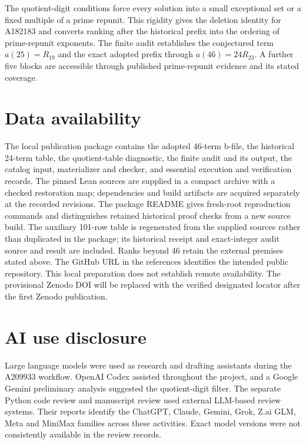 \documentclass[11pt]{article}
\begin{document}
The quotient-digit conditions force every solution into a small
exceptional set or a fixed multiple of a prime repunit. This rigidity
gives the deletion identity for A182183 and converts ranking after
the historical prefix into the ordering of prime-repunit exponents.
The finite audit establishes the conjectured term \(a(25)=R_{19}\)
and the exact adopted prefix through \(a(46)=24R_{23}\). A further
five blocks are accessible through published prime-repunit evidence
and its stated coverage.

\section*{Data availability}

The local publication package contains the adopted 46-term b-file,
the historical 24-term table, the quotient-table diagnostic, the finite
audit and its output, the catalog input, materializer and checker,
and essential execution and verification records. The pinned Lean
sources are supplied in a compact archive with a checked restoration
map; dependencies and build artifacts are acquired separately at the
recorded revisions. The package README gives fresh-root reproduction
commands and distinguishes retained historical proof checks from a
new source build. The auxiliary 101-row table is regenerated from
the supplied sources rather than duplicated in the package; its
historical receipt and exact-integer audit source and result are included.
Ranks beyond 46 retain the external premises stated above.
The GitHub URL in the references identifies the intended public
repository. This local preparation does not establish remote availability.
The provisional Zenodo DOI will be replaced with the verified
designated locator after the first Zenodo publication.

\section*{AI use disclosure}

Large language models were used as research and drafting assistants
during the A209933 workflow. OpenAI Codex assisted throughout the
project, and a Google Gemini preliminary analysis suggested the
quotient-digit filter. The separate Python code review and manuscript
review used external LLM-based review systems. Their reports identify
the ChatGPT, Claude, Gemini, Grok, Z.ai GLM, Meta and MiniMax
families across these activities. Exact model versions were not
consistently available in the review records.
\end{document}
